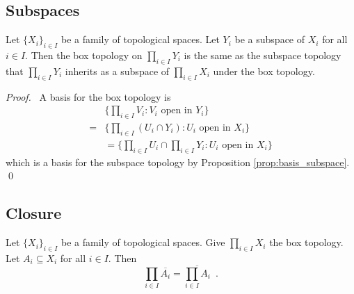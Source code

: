 \subsection{Subspaces}

\begin{prop}
Let $\{X_i\}_{i \in I}$ be a family of topological spaces. Let $Y_i$ be a subspace of $X_i$ for all $i \in I$. Then the box topology on $\prod_{i \in I} Y_i$ is the same as the subspace topology that $\prod_{i \in I} Y_i$ inherits as a subspace of $\prod_{i \in I} X_i$ under the box topology.
\end{prop}

\begin{proof}
\pf\ A basis for the box topology is
\begin{align*}
& \{ \prod_{i \in I} V_i : V_i \text{ open in } Y_i \} \\
= & \{ \prod_{i \in I} (U_i \cap Y_i) : U_i \text{ open in } X_i \} \\
& = \{ \prod_{i \in I} U_i \cap \prod_{i \in I} Y_i : U_i \text{ open in } X_i \}
\end{align*}
which is a basis for the subspace topology by Proposition \ref{prop:basis_subspace}. \qed
\end{proof}

\subsection{Closure}

\begin{prop}
Let $\{X_i\}_{i \in I}$ be a family of topological spaces. Give $\prod_{i \in I} X_i$ the box topology. Let $A_i \subseteq X_i$ for all $i \in I$. Then
\[ \prod_{i \in I} \overline{A_i} = \overline{\prod_{i \in I} A_i} \enspace . \]
\end{prop}

